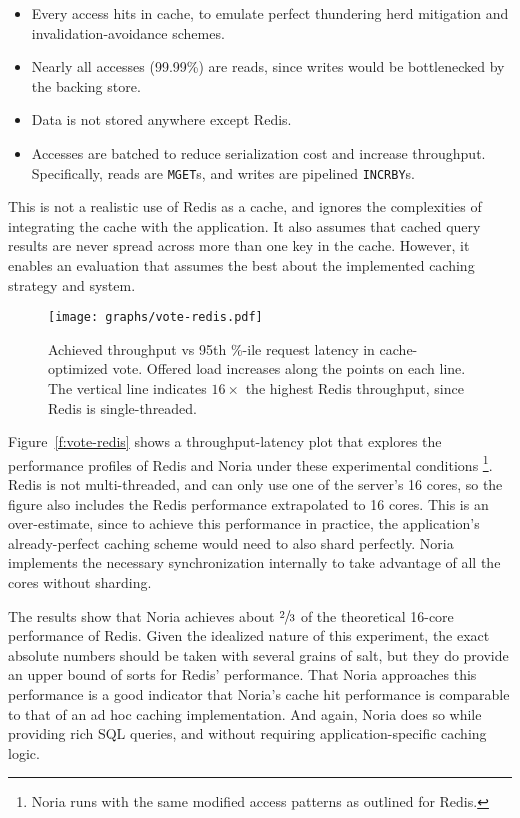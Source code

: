 \begin{itemize}
 \item Every access hits in cache, to emulate perfect thundering herd mitigation
   and invalidation-avoidance schemes.
 \item Nearly all accesses (99.99\%) are reads, since writes would be
   bottlenecked by the backing store.
 \item Data is not stored anywhere except Redis.
 \item Accesses are batched to reduce serialization cost and increase
   throughput. Specifically, reads are \texttt{MGET}s, and writes are pipelined
    \texttt{INCRBY}s.
\end{itemize}

This is not a realistic use of Redis as a cache, and ignores the complexities of
integrating the cache with the application. It also assumes that cached query
results are never spread across more than one key in the cache. However, it
enables an evaluation that assumes the best about the implemented caching
strategy and system.

\begin{figure}[h]
  \centering
  \texttt{[image: graphs/vote-redis.pdf]}
  \caption{Achieved throughput vs 95th \%-ile request latency in cache-optimized
  vote. Offered load increases along the points on each line. The vertical
  line indicates $16\times$ the highest Redis throughput, since Redis is
  single-threaded.}
  \label{f:vote-redis}
\end{figure}

Figure~\vref{f:vote-redis} shows a throughput-latency plot that explores the
performance profiles of Redis and Noria under these experimental conditions%
\footnote{Noria runs with the same modified access patterns as outlined for
Redis.}.
Redis is not multi-threaded, and can only use one of the server's 16 cores, so
the figure also includes the Redis performance extrapolated to 16 cores. This is
an over-estimate, since to achieve this performance in practice, the
application's already-perfect caching scheme would need to also shard perfectly.
Noria implements the necessary synchronization internally to take advantage of
all the cores without sharding.

The results show that Noria achieves about $\sfrac{2}{3}$ of the theoretical
16-core performance of Redis. Given the idealized nature of this experiment, the
exact absolute numbers should be taken with several grains of salt, but they do
provide an upper bound of sorts for Redis' performance. That Noria approaches
this performance is a good indicator that Noria's cache hit performance is
comparable to that of an ad hoc caching implementation. And again, Noria does so
while providing rich SQL queries, and without requiring application-specific
caching logic.

